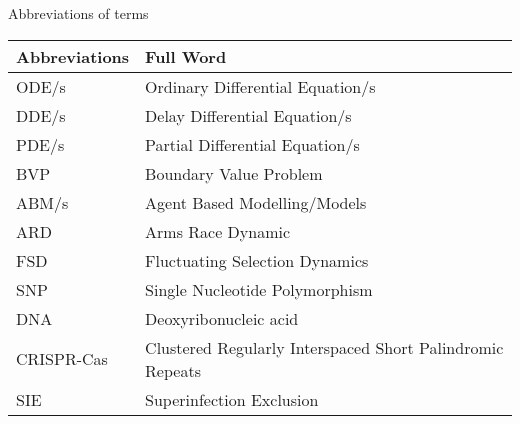Abbreviations of terms

\begin{table}[ht!]
    \begin{tabular}{|l|l|}
        \hline
        Abbreviations & Full Word                         \\ \hline
        ODE/s         & Ordinary Differential Equation/s \\ \hline
        DDE/s         & Delay Differential Equation/s \\ \hline
        PDE/s         & Partial Differential Equation/s \\ \hline
        BVP  & Boundary Value Problem \\ \hline
        ABM/s  & Agent Based Modelling/Models \\ \hline
        ARD  & Arms Race Dynamic \\ \hline
        FSD  & Fluctuating Selection Dynamics \\ \hline
        SNP  & Single Nucleotide Polymorphism \\ \hline
        DNA  & Deoxyribonucleic acid \\ \hline
        CRISPR-Cas & Clustered Regularly Interspaced Short Palindromic Repeats \\ \hline
        SIE & Superinfection Exclusion
    \end{tabular}
\end{table}
